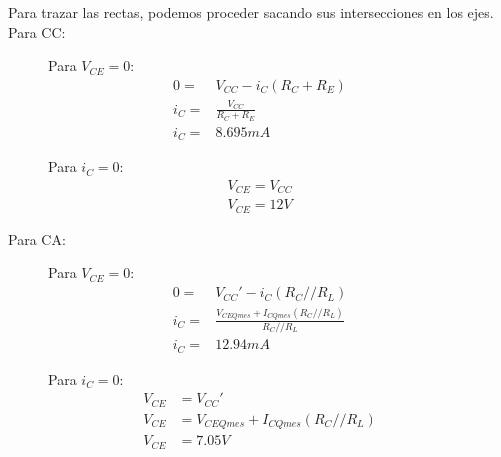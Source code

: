     Para trazar las rectas, podemos proceder sacando sus intersecciones en los ejes. Para CC:
    \begin{figure}[H]
      \centering
      \begin{minipage}[t]{0.49\textwidth}
        Para $V_{CE} = 0$:
        \begin{align*}
          0 =& V_{CC} - i_C(R_C + R_E)\\[6pt]
          i_C =& \frac{V_{CC}}{R_C + R_E}\\[6pt]
          i_C =& 8.695mA
        \end{align*}
      \end{minipage}
      \begin{minipage}[t]{0.49\textwidth}
        Para $i_C = 0$:
        \begin{align*}
          V_{CE} = V_{CC}\\[6pt]
          V_{CE} = 12V
        \end{align*}
      \end{minipage}
    \end{figure}

    Para CA:
    \begin{figure}[H]
      \centering
      \begin{minipage}[t]{0.49\textwidth}
        Para $V_{CE} = 0$:
        \begin{align*}
          0 =& V_{CC}' - i_C(R_C//R_L)\\[6pt]
          i_C =& \frac{V_{CEQ mes} + I_{CQ mes} (R_C//R_L)}{R_C//R_L}\\[6pt]
          i_C =& 12.94mA
        \end{align*}
      \end{minipage}
      \begin{minipage}[t]{0.49\textwidth}
        Para $i_C = 0$:
        \begin{align*}
          V_{CE} &= V_{CC}'\\[6pt]
          V_{CE} &= V_{CEQ mes} + I_{CQ mes} (R_C//R_L)\\[6pt]
          V_{CE} &= 7.05V
        \end{align*}
      \end{minipage}
    \end{figure}

